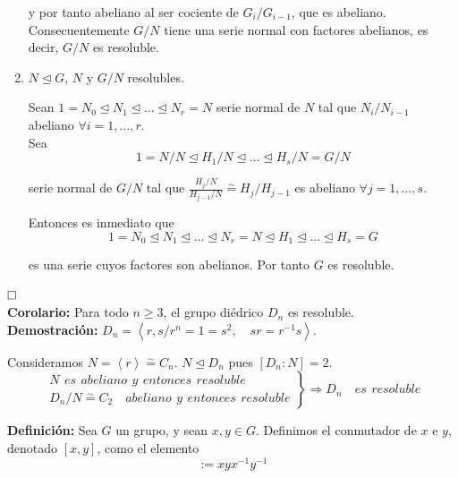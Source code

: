 \documentclass{article}
\begin{document}
\begin{enumerate}[1)]
y por tanto abeliano al ser cociente de $G_i/G_{i-1}$, que es abeliano. Consecuentemente $G/N$ tiene una serie normal con factores abelianos, es decir, $G/N$ es resoluble.

\item $N\unlhd G$, $N$ y $G/N$ resolubles.

Sean $1=N_0\unlhd N_1\unlhd \ldots\unlhd N_r=N$ serie normal de $N$ tal que $N_i/N_{i-1}$ abeliano $\forall i=1,\ldots,r$. \\

Sea 
\begin{equation*}
1=N/N\unlhd H_1/N\unlhd \ldots \unlhd H_s/N=G/N
\end{equation*}

serie normal de $G/N$ tal que $\frac{H_j/N}{H_{j-1}/N}\overset{\sim}{=} H_j/H_{j-1}$ es abeliano $\forall j=1,\ldots,s$.

Entonces es inmediato que 
\begin{equation*}
1=N_0\unlhd N_1\unlhd \ldots\unlhd N_r=N\unlhd H_1\unlhd \ldots\unlhd H_s=G
\end{equation*}

es una serie cuyos factores son abelianos. Por tanto $G$ es resoluble.
\end{enumerate}

$\hfill\square$ \\

\textbf{Corolario:} Para todo $n\geq 3$, el grupo diédrico $D_n$ es resoluble. \\

\textbf{Demostración:} $D_n=\left\langle r,s/r^n=1=s^2,\quad sr=r^{-1}s\right\rangle$. 

Consideramos $N=\left\langle r\right\rangle \overset{\sim}{=} C_n$. $N\unlhd D_n$ pues $[D_n:N]=2$.
\begin{equation*}
\left. \begin{array}{c}
N\:\,es\:\,abeliano\:\,y\:\,entonces\:\,resoluble \\
D_n/N\overset{\sim}{=} C_2\quad abeliano\:\,y\:\,entonces\:\,resoluble
\end{array} \right\rbrace \Rightarrow D_n\quad es\:\,resoluble
\end{equation*}

\textbf{Definición:} Sea $G$ un grupo, y sean $x,y\in G$. Definimos el conmutador de $x$ e $y$, denotado $[x,y]$, como el elemento
\begin{equation*}
[x,y]:=xyx^{-1}y^{-1}
\end{equation*}
\end{document}
